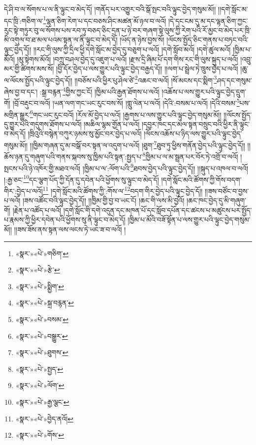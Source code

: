 དེ་ཤི་བ་ལ་སོགས་པ་ལ་ནི་ལྟུང་བ་མེད་དོ། །གནོད་པར་འགྱུར་བའི་སྒོ་སྤང་བའི་ལྟུང་བྱེད་གསུམ་མོ།། །།དགེ་སློང་མ་དང་ཁྲི་:གཅིག་ལ་\footnote{«སྣར་»«པེ་»གཅིག་}ལྷན་ཅིག་རེག་པ་དང་བཅས་ཤིང་མཚན་མོ་ཉལ་བ་ལའོ། །དེ་དང་ངམ་དུ་མ་དང་ལྷན་ཅིག་ཀྱང་རུང་སྟེ་གཏུར་བུ་ལ་སོགས་པས་རབ་ཏུ་བཅད་ཅིང་དྲན་པ་ཉེ་བར་གཞག་སྟེ་ལུས་ཀྱི་རེག་པའི་རོ་མྱང་བ་མེད་པར་ཁྲི་མི་འགུལ་བ་ཐ་མལ་པའམ་སྟན་ལ་ནི་ལྟུང་བ་མེད་དོ། །ཡོད་ན་ཉེས་བྱས་སོ། །ལོངས་སྤྱོད་ཅིང་གནས་པ་བཏང་བའི་ལྟུང་བྱེད་དོ།། །།རང་གི་ལུས་ཀྱི་དྲིལ་ཕྱི་དགེ་སློང་མ་བྱེད་དུ་བཅུག་པ་ལའོ། །དགེ་སློབ་མའོ། །དགེ་ཚུལ་མའོ། །ཁྱིམ་པ་མོའོ། །མུ་སྟེགས་མོའོ། །བཀྲུ་བཤལ་བྱེད་དུ་འཇུག་པ་ལའོ། །རྫས་དྲི་ཞིམ་པོ་དག་གིས་རང་གི་ལུས་སྐུད་པ་ལའོ། །འབྲུ་མར་གྱི་ཚིགས་མས་སོ། །བྱི་དོར་བྱེད་པ་ལས་གྱུར་པའི་ལྟུང་བྱེད་བརྒྱད་དོ།། །།ལག་པ་སྦྲེལ་ཏེ་ཁྲུས་བྱེད་པ་ལའོ། །ཆུ་ལ་ལོངས་སྤྱོད་པའི་ལྟུང་བྱེད་དོ།། །།བཅོས་པའི་ཕྱིར་པུ་ཤེལ་ཙེ་\footnote{«སྣར་»«པེ་»རྩེ་}འཆང་བ་ལའོ། །སོ་མངས་དང་སྨིག་\footnote{«སྣར་»«པེ་»སྨྱིག་}ཤད་དང་གསུམ་ཞེས་བྱ་བ་དང་། :སྒྲ་བརྙན་\footnote{«སྣར་»«པེ་»སྐྲ་བརྙན་}གྱིས་ཀྱང་ངོ། །ཁྱིམ་པའི་རྒྱན་ཐོགས་པ་ལའོ། །འཆོས་པ་ལས་གྱུར་པའི་ལྟུང་བྱེད་དྲུག་གོ། །བྲོ་བརྡུང་བ་ལའོ། །ཡན་ལག་གང་ཡང་རུང་བས་སོ། །གླུ་ལེན་པ་ལའོ། །དེའི་:བསམ་པ་ལའོ། །དེའི་བསམ་\footnote{«སྣར་»«པེ་»བསམ་}པས་མགྲིན་སྒྱུར་\footnote{«སྣར་»«པེ་»བསྒྱུར་}གང་ཡང་རུང་བའོ། །རོལ་མོ་བྱེད་པ་ལའོ། །རྒྱགས་པ་ལས་གྱུར་པའི་ལྟུང་བྱེད་གསུམ་མོ།། །།ལོངས་སྤྱོད་དུ་གྱུར་པའི་གདུགས་ཐོགས་པ་ལའོ། །མཆིལ་ལྷམ་གྱོན་པ་ལའོ། །དབྱར་ཁང་དང་མལ་སྟན་བསྲུང་བའི་ཕྱིར་ནི་ལྟུང་བ་མེད་དོ། །ཁྲིའུའི་བསྙེན་བཀུར་ཉམས་སུ་མྱོང་བར་བྱེད་པ་ལའོ། །ལོངས་འཆོས་པ་ཉིད་ལས་གྱུར་པའི་ལྟུང་བྱེད་གསུམ་མོ།། །།ཁྱིམ་གཞན་དུ་མ་བསྒོ་བར་སྟན་ལ་འདུག་པ་ལའོ། །ཐུག་\footnote{«སྣར་»«པེ་»ཐུགས་}ཐུབ་ཏུ་ཕྱིས་གནོན་བྱེད་པའི་ལྟུང་བྱེད་དོ།། །།ཆོས་ཉན་དུ་གཞུག་པའི་གནས་སྐབས་སུ་ཁྱིམ་པའི་སྟན་:སྤྱད་པ་\footnote{«སྣར་»«པེ་»སྤྱད་}ཁྱིམ་པ་ལ་མ་སྦྲན་པར་བོར་ཏེ་འགྲོ་བ་ལའོ། །སྤངས་པའི་ཉེ་འཁོར་གྱི་མཐའ་ལའོ། །ཁྱིམ་པ་ལ་:ལོག་པའི་\footnote{«སྣར་»«པེ་»ལོག་}ཐབས་བྱེད་པའི་ལྟུང་བྱེད་དོ།། །།སྐུད་པ་འཁལ་བ་ལའོ། །:རྒྱ་ཅང་\footnote{«སྣར་»«པེ་»རྒྱ་ལྕང་}དང་ལྕག་པོད་ཀྱི་དོན་དུ་དབེན་པའི་ཕྱོགས་སུ་ལྟུང་བ་མེད་དོ། །དགེ་སློང་མའི་ཚོགས་ཀྱི་གོས་བདག་གིར་:བྱེད་པ་ལའོ།\footnote{«སྣར་»«པེ་»བྱེད་ནའོ།} །དགེ་སློང་མའི་ཚོགས་ཀྱི་:གོས་ལ་\footnote{«སྣར་»«པེ་»གོས་}བདག་གིར་བྱེད་པའི་ལྟུང་བྱེད་དོ།། །།ཟས་བཙོང་བ་བྱས་པ་ལའོ། །ཟས་འཚོང་བའི་ལྟུང་བྱེད་དོ།། །།ཁྱིམ་གྱི་བྱ་བ་ཡང་ངོ། །ཆང་གི་ལས་མི་བྱའོ། །ཆང་ཁང་བྱེད་དུ་མི་གཞུག་གོ། །རྗེན་པ་འཚོད་པ་ལའོ། །དགེ་སློང་གི་དགེ་འདུན་དང་མཁན་པོ་དང་སློབ་དཔོན་དང་ཚངས་པ་མཚུངས་པར་སྤྱོད་པ་རྣམས་ཀྱི་ཕྱིར་དབེན་པའི་ཕྱོགས་སུ་ནི་ལྟུང་བ་མེད་དོ། །ཁྱིམ་པ་མོའི་བཟོ་སྟོན་པ་ལས་གྱུར་པའི་ལྟུང་བྱེད་གསུམ་མོ།། །།ཟས་ཟོས་ནས་སྟན་ལས་ལངས་ཏེ་ཡང་ཟ་བ་ལའོ། །
